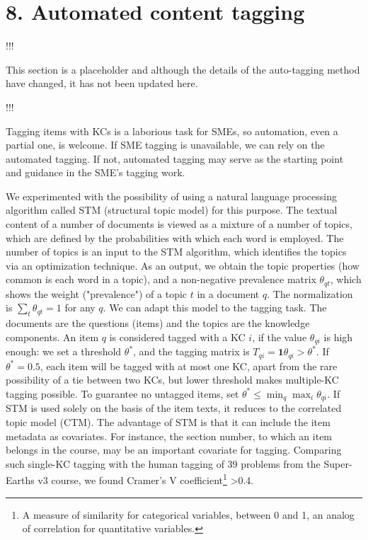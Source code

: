 \documentclass{sigchi}
\newcommand{\1}{\mathbf{1}}
\begin{document}
\section{8. Automated content tagging}

!!!

This section is a placeholder and although the details of the auto-tagging method have changed, it has not been updated here. 

!!!

Tagging items with KCs is a laborious task for SMEs, so automation, even a partial one, is welcome. If SME tagging is unavailable, we can rely on the automated tagging. If not, automated tagging may serve as the starting point and guidance in the SME's tagging work.

We experimented with the possibility of using a natural language processing algorithm called STM (structural topic model) for this purpose. The textual content of a number of documents is viewed as a mixture of a number of topics, which are defined by the probabilities with which each word is employed. The number of topics is an input to the STM algorithm, which identifies the topics via an optimization technique. As an output, we obtain the  topic properties (how common is each word in a topic), and a non-negative prevalence matrix $\theta_{qt}$, which shows the weight ("prevalence") of a topic $t$ in a document $q$. The normalization is $\sum_{t}\theta_{qt}=1$ for any $q$. We can adapt this model to the tagging task. The documents are the questions (items) and the topics are the knowledge components. An item $q$ is considered tagged with a KC $i$, if the value $\theta_{qi}$ is high enough: we set a threshold $\theta^*$, and the tagging matrix is $T_{qi}=\1{\theta_{qi}>\theta^*}$. If $\theta^*=0.5$, each item will be tagged with at most one KC, apart from the rare possibility of a tie between two KCs, but lower threshold makes multiple-KC tagging possible. To guarantee no untagged items, set $\theta^*\leq\min_q\max_i\theta_{qi}$. If STM is used solely on the basis of the item texts, it reduces to the correlated topic model (CTM). The advantage of STM is that it can include the item metadata as covariates. For instance, the section number, to which an item belongs in the course, may be an important covariate for tagging. Comparing such single-KC tagging with the human tagging of 39 problems from the Super-Earths v3 course, we found Cramer's V coefficient\footnote{A measure of similarity for categorical variables, between 0 and 1, an analog of correlation for quantitative variables.} >0.4.
\end{document}
